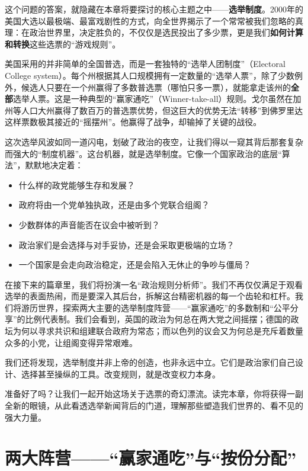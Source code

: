 这个问题的答案，就隐藏在本章将要探讨的核心主题之中——\textbf{选举制度}。2000年的美国大选以最极端、最富戏剧性的方式，向全世界揭示了一个常常被我们忽略的真理：在政治世界里，决定胜负的，不仅仅是选民投出了多少票，更是我们\textbf{如何计算和转换}这些选票的“游戏规则”。

美国采用的并非简单的全国普选，而是一套独特的“选举人团制度”（Electoral College system）。每个州根据其人口规模拥有一定数量的“选举人票”，除了少数例外，候选人只要在一个州赢得了多数普选票（哪怕只多一票），就能拿走该州的\textbf{全部}选举人票。这是一种典型的“赢家通吃”（Winner-take-all）规则。戈尔虽然在加州等人口大州赢得了数百万的普选票优势，但这巨大的优势无法“转移”到佛罗里达这样票数极其接近的“摇摆州”。他赢得了战争，却输掉了关键的战役。

这次选举风波如同一道闪电，划破了政治的夜空，让我们得以一窥其背后那套复杂而强大的“制度机器”。这台机器，就是选举制度。它像一个国家政治的底层“算法”，默默地决定着：

\begin{itemize}
    \item 什么样的政党能够生存和发展？
    \item 政府将由一个党单独执政，还是由多个党联合组阁？
    \item 少数群体的声音能否在议会中被听到？
    \item 政治家们是会选择与对手妥协，还是会采取更极端的立场？
    \item 一个国家是会走向政治稳定，还是会陷入无休止的争吵与僵局？
\end{itemize}

在接下来的篇章里，我们将扮演一名“政治规则分析师”。我们不再仅仅满足于观看选举的表面热闹，而是要深入其后台，拆解这台精密机器的每一个齿轮和杠杆。我们将游历世界，探索两大主要的选举制度阵营——“赢家通吃”的多数制和“公平分享”的比例代表制。我们会看到，英国的政治为何总在两大党之间摇摆；德国的政坛为何以寻求共识和组建联合政府为常态；而以色列的议会又为何总是充斥着数量众多的小党，让组阁变得异常艰难。

我们还将发现，选举制度并非上帝的创造，也非永远中立。它们是政治家们自己设计、选择甚至操纵的工具。改变规则，就是改变权力本身。

准备好了吗？让我们一起开始这场关于选票的奇幻漂流。读完本章，你将获得一副全新的眼镜，从此看透选举新闻背后的门道，理解那些塑造我们世界的、看不见的强大力量。

\section{两大阵营——“赢家通吃”与“按份分配”}

